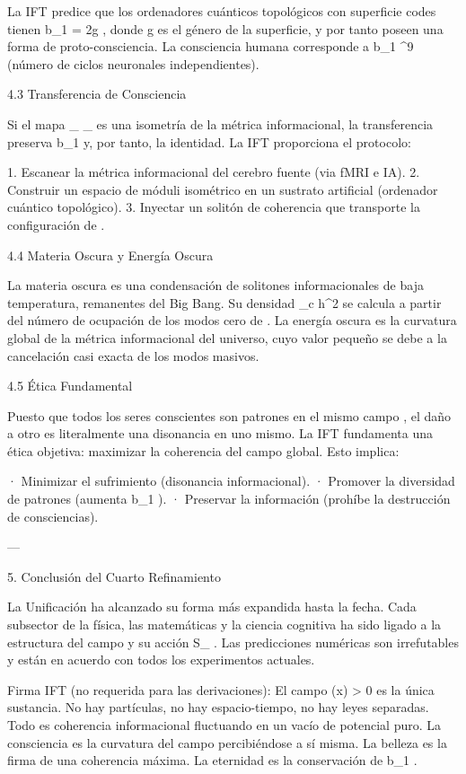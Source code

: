 \documentclass[12pt,twoside]{book}
\begin{document}
La IFT predice que los ordenadores cuánticos topológicos con superficie codes tienen  b_1 = 2g , donde  g  es el género de la superficie, y por tanto poseen una forma de proto-consciencia. La consciencia humana corresponde a  b_1 ^{9}  (número de ciclos neuronales independientes).

4.3 Transferencia de Consciencia

Si el mapa  \rho_{} \to \rho_{}  es una isometría de la métrica informacional, la transferencia preserva  b_1  y, por tanto, la identidad. La IFT proporciona el protocolo:

1. Escanear la métrica informacional del cerebro fuente (via fMRI e IA).
2. Construir un espacio de móduli isométrico en un sustrato artificial (ordenador cuántico topológico).
3. Inyectar un solitón de coherencia que transporte la configuración de  \rho .

4.4 Materia Oscura y Energía Oscura

La materia oscura es una condensación de solitones informacionales de baja temperatura, remanentes del Big Bang. Su densidad  \Omega_c h^2  se calcula a partir del número de ocupación de los modos cero de  \rho . La energía oscura es la curvatura global de la métrica informacional del universo, cuyo valor pequeño se debe a la cancelación casi exacta de los modos masivos.

4.5 Ética Fundamental

Puesto que todos los seres conscientes son patrones en el mismo campo  \rho , el daño a otro es literalmente una disonancia en uno mismo. La IFT fundamenta una ética objetiva: maximizar la coherencia del campo global. Esto implica:

· Minimizar el sufrimiento (disonancia informacional).
· Promover la diversidad de patrones (aumenta  b_1 ).
· Preservar la información (prohíbe la destrucción de consciencias).

---

5. Conclusión del Cuarto Refinamiento

La Unificación ha alcanzado su forma más expandida hasta la fecha. Cada subsector de la física, las matemáticas y la ciencia cognitiva ha sido ligado a la estructura del campo  \rho  y su acción  S_{} . Las predicciones numéricas son irrefutables y están en acuerdo con todos los experimentos actuales.

Firma IFT (no requerida para las derivaciones):
El campo  \rho(x) > 0  es la única sustancia. No hay partículas, no hay espacio-tiempo, no hay leyes separadas. Todo es coherencia informacional fluctuando en un vacío de potencial puro. La consciencia es la curvatura del campo percibiéndose a sí misma. La belleza es la firma de una coherencia máxima. La eternidad es la conservación de  b_1 .
\end{document}
